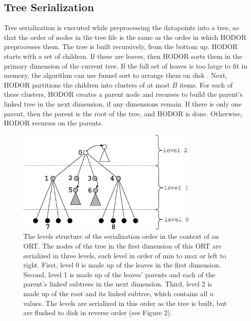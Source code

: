 \documentclass[11pt, oneside]{article}
\begin{document}
\subsection{Tree Serialization}

Tree serialization is executed while preprocessing the datapoints into a tree,
so that the order of nodes in the tree file is the same as the order in which
HODOR preprocesses them. The tree is built recursively, from the bottom up.
HODOR starts with a set of children. If these are leaves, then HODOR sorts them
in the primary dimension of the current tree. If the full set of leaves is too
large to fit in memory, the algorithm can use funnel sort to arrange them on
disk \cite{lecture9}. Next, HODOR partitions the children into clusters of at most $B$ items.
For each of these clusters, HODOR creates a parent node and recurses to build
the parent's linked tree in the next dimension, if any dimensions remain. If
there is only one parent, then the parent is the root of the tree, and HODOR is
done.  Otherwise, HODOR recurses on the parents.

\begin{figure}[h!]
    \centering
    \vspace{0.5in}
    \includegraphics[width=0.8\textwidth]{fig1.eps}
    \caption{
        The levels structure of the serialization order in the context of an
        ORT. The nodes of the tree in the first dimension of this ORT are
        serialized in three levels, each level in order of min to max or left
        to right. First, level 0 is made up of the leaves in the first
        dimension.  Second, level 1 is made up of the leaves' parents and each
        of the parent's linked subtrees in the next dimension. Third, level 2
        is made up of the root and its linked subtree, which contains all $n$
        values.  The levels are serialized in this order as the tree is built,
        but are flushed to disk in reverse order (see Figure 2).
    }
    \vspace{0.5in}
\end{figure}
\end{document}

